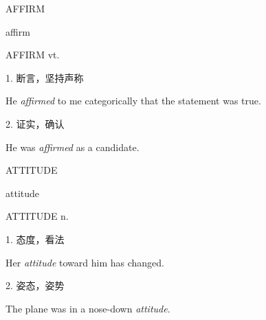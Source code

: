 \begin{flashcard}{
AFFIRM

affirm
}
\begin{center}
AFFIRM vt. 
\end{center}
1. 断言，坚持声称

He \textit{affirmed} to me categorically that the statement was true.

2. 证实，确认

He was \textit{affirmed} as a candidate.

\end{flashcard}
\begin{flashcard}{
ATTITUDE

attitude
}
\begin{center}
ATTITUDE n. 
\end{center}
1. 态度，看法

Her \textit{attitude} toward him has changed.

2. 姿态，姿势

The plane was in a nose-down \textit{attitude}.

\end{flashcard}

